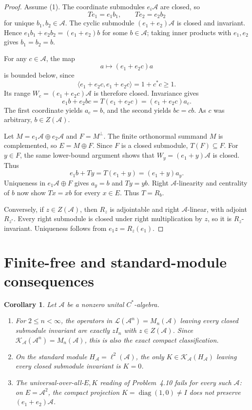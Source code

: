 \documentclass[11pt]{article}
\newtheorem{corollary}{Corollary}
\newcommand{\A}{\mathcal A}
\newcommand{\Ladj}{\mathcal L}
\newcommand{\Kcomp}{\mathcal K}
\begin{document}
\begin{proof}
Assume (1).  The coordinate submodules $e_i\A$ are closed, so
\[
 T e_1=e_1b_1,\qquad T e_2=e_2b_2
\]
for unique $b_1,b_2\in\A$.  The cyclic submodule
$(e_1+e_2)\A$ is closed and invariant.  Hence
$e_1b_1+e_2b_2=(e_1+e_2)b$ for some $b\in\A$; taking inner products with
$e_1,e_2$ gives $b_1=b_2=b$.

For any $c\in\A$, the map
\[
 a\longmapsto(e_1+e_2c)a
\]
is bounded below, since
\[
 \langle e_1+e_2c,e_1+e_2c\rangle=1+c^*c\geq1.
\]
Its range $W_c=(e_1+e_2c)\A$ is therefore closed.  Invariance gives
\[
 e_1b+e_2bc=T(e_1+e_2c)=(e_1+e_2c)a_c.
\]
The first coordinate yields $a_c=b$, and the second yields $bc=cb$.
As $c$ was arbitrary, $b\in Z(\A)$.

Let $M=e_1\A\oplus e_2\A$ and $F=M^\perp$.  The finite orthonormal
summand $M$ is complemented, so $E=M\oplus F$.  Since $F$ is a closed
submodule, $T(F)\subseteq F$.  For $y\in F$, the same lower-bound argument
shows that $W_y=(e_1+y)\A$ is closed.  Thus
\[
 e_1b+Ty=T(e_1+y)=(e_1+y)a_y.
\]
Uniqueness in $e_1\A\oplus F$ gives $a_y=b$ and $Ty=yb$.  Right
$\A$-linearity and centrality of $b$ now show $Tx=xb$ for every
$x\in E$.  Thus $T=R_b$.

Conversely, if $z\in Z(\A)$, then $R_z$ is adjointable and right
$\A$-linear, with adjoint $R_{z^*}$.  Every right submodule is closed under
right multiplication by $z$, so it is $R_z$-invariant.  Uniqueness follows
from $e_1z=R_z(e_1)$.
\end{proof}

\section{Finite-free and standard-module consequences}

\begin{corollary}\label{cor:standard}
Let $\A$ be a nonzero unital $C^*$-algebra.
\begin{enumerate}
 \item For $2\leq n<\infty$, the operators in $\Ladj(\A^n)=M_n(\A)$
 leaving every closed submodule invariant are exactly $zI_n$ with
 $z\in Z(\A)$.  Since $\Kcomp_{\A}(\A^n)=M_n(\A)$, this is also the exact
 compact classification.
 \item On the standard module $H_{\A}=\ell^2(\A)$, the only
 $K\in\Kcomp_{\A}(H_{\A})$ leaving every closed submodule invariant is
 $K=0$.
 \item The universal-over-all-$E,K$ reading of Problem~4.10 fails for every
 such $\A$: on $E=\A^2$, the compact projection
 $K=\operatorname{diag}(1,0)\neq I$ does not preserve
 $(e_1+e_2)\A$.
\end{enumerate}
\end{corollary}
\end{document}
